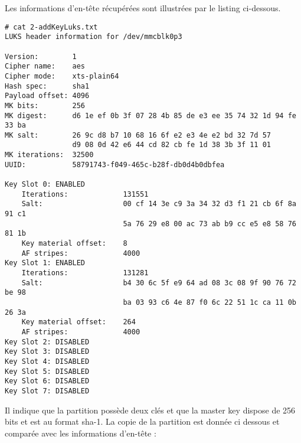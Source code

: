 Les informations d'en-tête récupérées sont illustrées par le listing ci-dessous.
\begin{lstlisting}[style=Bash]
# cat 2-addKeyLuks.txt 
LUKS header information for /dev/mmcblk0p3

Version:       	1
Cipher name:   	aes
Cipher mode:   	xts-plain64
Hash spec:     	sha1
Payload offset:	4096
MK bits:       	256
MK digest:     	d6 1e ef 0b 3f 07 28 4b 85 de e3 ee 35 74 32 1d 94 fe 33 ba 
MK salt:       	26 9c d8 b7 10 68 16 6f e2 e3 4e e2 bd 32 7d 57 
               	d9 08 0d 42 e6 44 cd 82 cb fe 1d 38 3b 3f 11 01 
MK iterations: 	32500
UUID:          	58791743-f049-465c-b28f-db0d4b0dbfea

Key Slot 0: ENABLED
	Iterations:         	131551
	Salt:               	00 cf 14 3e c9 3a 34 32 d3 f1 21 cb 6f 8a 91 c1 
	                      	5a 76 29 e8 00 ac 73 ab b9 cc e5 e8 58 76 81 1b 
	Key material offset:	8
	AF stripes:            	4000
Key Slot 1: ENABLED
	Iterations:         	131281
	Salt:               	b4 30 6c 5f e9 64 ad 08 3c 08 9f 90 76 72 be 98 
	                      	ba 03 93 c6 4e 87 f0 6c 22 51 1c ca 11 0b 26 3a 
	Key material offset:	264
	AF stripes:            	4000
Key Slot 2: DISABLED
Key Slot 3: DISABLED
Key Slot 4: DISABLED
Key Slot 5: DISABLED
Key Slot 6: DISABLED
Key Slot 7: DISABLED
\end{lstlisting}
Il indique que la partition possède deux clés et que la master key dispose de 256 bits et est au format sha-1. La copie de la partition est donnée ci dessous et comparée avec les informations d'en-tête :

